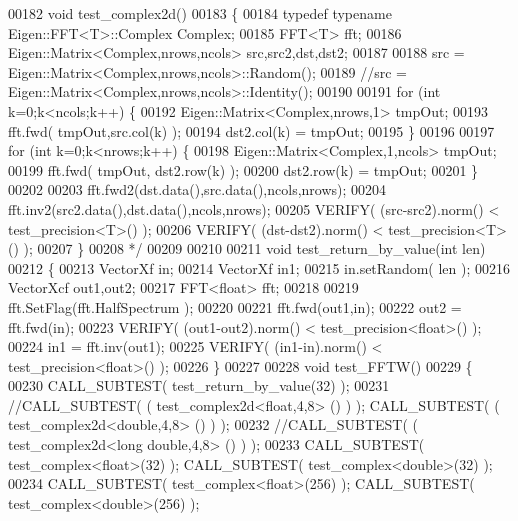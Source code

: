 \begin{DoxyCode}
00182 \textcolor{comment}{void test\_complex2d()}
00183 \textcolor{comment}{\{}
00184 \textcolor{comment}{    typedef typename Eigen::FFT<T>::Complex Complex;}
00185 \textcolor{comment}{    FFT<T> fft;}
00186 \textcolor{comment}{    Eigen::Matrix<Complex,nrows,ncols> src,src2,dst,dst2;}
00187 \textcolor{comment}{}
00188 \textcolor{comment}{    src = Eigen::Matrix<Complex,nrows,ncols>::Random();}
00189 \textcolor{comment}{    //src =  Eigen::Matrix<Complex,nrows,ncols>::Identity();}
00190 \textcolor{comment}{}
00191 \textcolor{comment}{    for (int k=0;k<ncols;k++) \{}
00192 \textcolor{comment}{        Eigen::Matrix<Complex,nrows,1> tmpOut;}
00193 \textcolor{comment}{        fft.fwd( tmpOut,src.col(k) );}
00194 \textcolor{comment}{        dst2.col(k) = tmpOut;}
00195 \textcolor{comment}{    \}}
00196 \textcolor{comment}{}
00197 \textcolor{comment}{    for (int k=0;k<nrows;k++) \{}
00198 \textcolor{comment}{        Eigen::Matrix<Complex,1,ncols> tmpOut;}
00199 \textcolor{comment}{        fft.fwd( tmpOut,  dst2.row(k) );}
00200 \textcolor{comment}{        dst2.row(k) = tmpOut;}
00201 \textcolor{comment}{    \}}
00202 \textcolor{comment}{}
00203 \textcolor{comment}{    fft.fwd2(dst.data(),src.data(),ncols,nrows);}
00204 \textcolor{comment}{    fft.inv2(src2.data(),dst.data(),ncols,nrows);}
00205 \textcolor{comment}{    VERIFY( (src-src2).norm() < test\_precision<T>() );}
00206 \textcolor{comment}{    VERIFY( (dst-dst2).norm() < test\_precision<T>() );}
00207 \textcolor{comment}{\}}
00208 \textcolor{comment}{*/}
00209 
00210 
00211 \textcolor{keywordtype}{void} test\_return\_by\_value(\textcolor{keywordtype}{int} len)
00212 \{
00213     VectorXf in;
00214     VectorXf in1;
00215     in.setRandom( len );
00216     VectorXcf out1,out2;
00217     FFT<float> fft;
00218 
00219     fft.SetFlag(fft.HalfSpectrum );
00220 
00221     fft.fwd(out1,in);
00222     out2 = fft.fwd(in);
00223     VERIFY( (out1-out2).norm() < test\_precision<float>() );
00224     in1 = fft.inv(out1);
00225     VERIFY( (in1-in).norm() < test\_precision<float>() );
00226 \}
00227 
00228 \textcolor{keywordtype}{void} test\_FFTW()
00229 \{
00230   CALL\_SUBTEST( test\_return\_by\_value(32) );
00231   \textcolor{comment}{//CALL\_SUBTEST( ( test\_complex2d<float,4,8> () ) ); CALL\_SUBTEST( ( test\_complex2d<double,4,8> () ) );}
00232   \textcolor{comment}{//CALL\_SUBTEST( ( test\_complex2d<long double,4,8> () ) );}
00233   CALL\_SUBTEST( test\_complex<float>(32) ); CALL\_SUBTEST( test\_complex<double>(32) ); 
00234   CALL\_SUBTEST( test\_complex<float>(256) ); CALL\_SUBTEST( test\_complex<double>(256) ); 

\end{DoxyCode}
